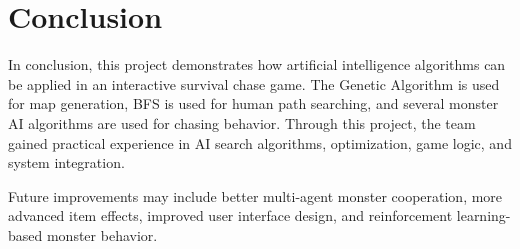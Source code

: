 \section{Conclusion}

In conclusion, this project demonstrates how artificial intelligence algorithms can be applied in an interactive survival chase game. The Genetic Algorithm is used for map generation, BFS is used for human path searching, and several monster AI algorithms are used for chasing behavior. Through this project, the team gained practical experience in AI search algorithms, optimization, game logic, and system integration.

Future improvements may include better multi-agent monster cooperation, more advanced item effects, improved user interface design, and reinforcement learning-based monster behavior.
